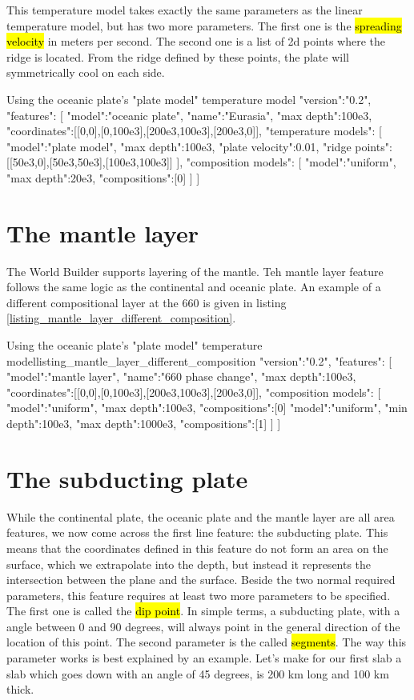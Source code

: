 \documentclass{book}
\newcommand{\WB}{{World Builder}}
\begin{document}
This temperature model takes exactly the same parameters as the linear temperature model, but has two more parameters. The first one is the \hl{spreading velocity} in meters per second. The second one is a list of 2d points where the ridge is located. From the ridge defined by these points, the plate will symmetrically cool on each side.

\begin{javascriptcode}{Using the oceanic plate's "plate model" temperature model}{}
{
  "version":"0.2",
  "features":
  [
    {
      "model":"oceanic plate", "name":"Eurasia", "max depth":100e3,
      "coordinates":[[0,0],[0,100e3],[200e3,100e3],[200e3,0]],
      "temperature models":
      [
        {
          "model":"plate model", "max depth":100e3, "plate velocity":0.01,
          "ridge points":[[50e3,0],[50e3,50e3],[100e3,100e3]]
        }
      ],
      "composition models":
      [
        {"model":"uniform", "max depth":20e3, "compositions":[0]}
      ]
    }
  ]
}
\end{javascriptcode}

\section{The mantle layer}
The \WB{} supports layering of the mantle. Teh mantle layer feature follows the same logic as the continental and oceanic plate. An example of a different compositional layer at the 660 is given in listing \ref{listing_mantle_layer_different_composition}.

\begin{javascriptcode}{Using the oceanic plate's "plate model" temperature model}{listing_mantle_layer_different_composition}
{
  "version":"0.2",
  "features":
  [
    {
      "model":"mantle layer", "name":"660 phase change", "max depth":100e3,
      "coordinates":[[0,0],[0,100e3],[200e3,100e3],[200e3,0]],
      "composition models":
      [
        {"model":"uniform", "max depth":100e3, "compositions":[0]}
        {"model":"uniform", "min depth":100e3, "max depth":1000e3, "compositions":[1]}
      ]
    }
  ]
}
\end{javascriptcode}

\section{The subducting plate}
While the continental plate, the oceanic plate and the mantle layer are all area features, we now come across the first line feature: the subducting plate. This means that the coordinates defined in this feature do not form an area on the surface, which we extrapolate into the depth, but instead it represents the intersection between the plane and the surface. Beside the two normal required parameters, this feature requires at least two more parameters to be specified. The first one is called the \hl{dip point}. In simple terms, a subducting plate, with a angle between 0 and 90 degrees, will always point in the general direction of the location of this point. The second parameter is the called \hl{segments}. The way this parameter works is best explained by an example. Let's make for our first slab a slab which goes down with an angle of 45 degrees, is 200 km long and 100 km thick.
\end{document}
